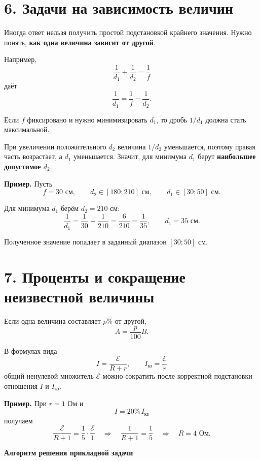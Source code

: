 \documentclass[a4paper,12pt]{article}
\newcommand{\sectionline}{\par\vspace{0.3em}{\color{accent}\hrule height 0.7pt}\vspace{0.7em}}
\begin{document}
\section*{6. Задачи на зависимость величин}
\sectionline

Иногда ответ нельзя получить простой подстановкой крайнего значения. Нужно понять, \textbf{как одна величина зависит от другой}.

Например,
\[
\frac1{d_1}+\frac1{d_2}=\frac1f
\]
даёт
\[
\frac1{d_1}=\frac1f-\frac1{d_2}.
\]

Если $f$ фиксировано и нужно минимизировать $d_1$, то дробь $1/d_1$ должна стать максимальной.

При увеличении положительного $d_2$ величина $1/d_2$ уменьшается, поэтому правая часть возрастает, а $d_1$ уменьшается. Значит, для минимума $d_1$ берут \textbf{наибольшее допустимое $d_2$}.

\textbf{Пример.} Пусть
\[
f=30\text{ см},
\qquad
d_2\in[180;210]\text{ см},
\qquad
d_1\in[30;50]\text{ см}.
\]

Для минимума $d_1$ берём $d_2=210$ см:
\[
\frac1{d_1}
=
\frac1{30}-\frac1{210}
=
\frac6{210}
=
\frac1{35},
\qquad
d_1=35\text{ см}.
\]

Полученное значение попадает в заданный диапазон $[30;50]$ см.

\section*{7. Проценты и сокращение неизвестной величины}
\sectionline

Если одна величина составляет $p\%$ от другой,
\[
A=\frac{p}{100}B.
\]

В формулах вида
\[
I=\frac{\mathcal E}{R+r},
\qquad
I_{\text{кз}}=\frac{\mathcal E}{r}
\]
общий ненулевой множитель $\mathcal E$ можно сократить после корректной подстановки отношения $I$ и $I_{\text{кз}}$.

\textbf{Пример.} При $r=1$ Ом и
\[
I=20\%\,I_{\text{кз}}
\]
получаем
\[
\frac{\mathcal E}{R+1}
=
\frac15\cdot\frac{\mathcal E}{1}
\quad\Longrightarrow\quad
\frac1{R+1}
=
\frac15
\quad\Longrightarrow\quad
R=4\text{ Ом}.
\]

\clearpage
\thispagestyle{plain}

\begin{center}
{\Large\bfseries\color{darkaccent}Алгоритм решения прикладной задачи}
\end{center}

\vspace{6mm}
\end{document}
